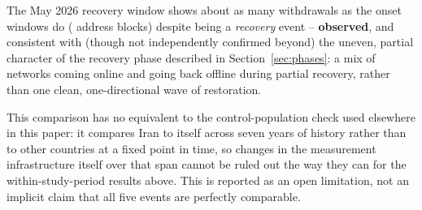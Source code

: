The May 2026 recovery window shows about as many withdrawals as the onset
windows do (\nWithdrawnMayRestoration{} address blocks) despite being a
\emph{recovery} event -- \textbf{observed}, and consistent with (though
not independently confirmed beyond) the uneven, partial character of the
recovery phase described in Section~\ref{sec:phases}: a mix of networks
coming online and going back offline during partial recovery, rather than
one clean, one-directional wave of restoration.

This comparison has no equivalent to the control-population check used
elsewhere in this paper: it compares Iran to itself across seven years of
history rather than to other countries at a fixed point in time, so
changes in the measurement infrastructure itself over that span cannot be
ruled out the way they can for the within-study-period results above. This
is reported as an open limitation, not an implicit claim that all five
events are perfectly comparable.
